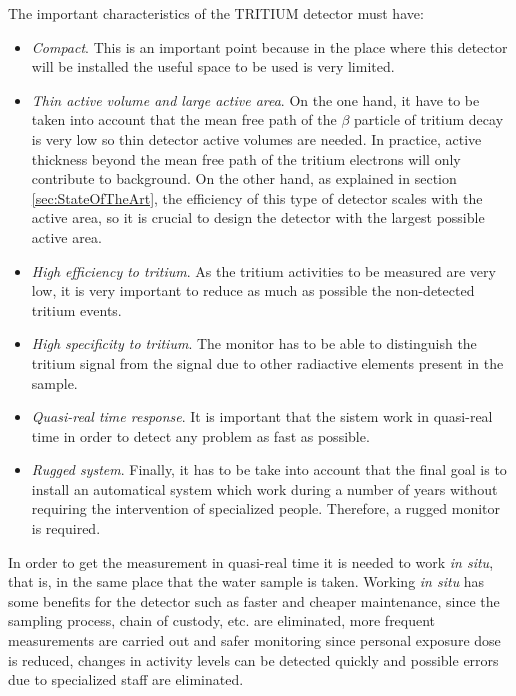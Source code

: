 The important characteristics of the TRITIUM detector must have:

\begin{itemize}

\item{} \textit{Compact}. This is an important point because in the place where this detector will be installed the useful space to be used is very limited.

\item{} \textit{Thin active volume and large active area}. On the one hand, it have to be taken into account that the mean free path of the $\beta$ particle of tritium decay is very low so thin detector active volumes are needed. In practice, active thickness beyond the mean free path of the tritium electrons will only contribute to background. On the other hand, as explained in section \ref{sec:StateOfTheArt}, the efficiency of this type of detector scales with the active area, so it is crucial to design the detector with the largest possible active area.

\item{} \textit{High efficiency to tritium}. As the tritium activities to be measured are very low, it is very important to reduce as much as possible the non-detected tritium events.

\item{} \textit{High specificity to tritium}. The monitor has to be able to distinguish the tritium signal from the signal due to other radiactive elements present in the sample.

\item{} \textit{Quasi-real time response}. It is important that the sistem work in quasi-real time in order to detect any problem as fast as possible. 

\item{} \textit{Rugged system}. Finally, it has to be take into account that the final goal is to install an automatical system which work during a number of years without requiring the intervention of specialized people. Therefore, a rugged monitor is required.

\end{itemize}

In order to get the measurement in quasi-real time it is needed to work \textit{in situ}, that is, in the same place that the water sample is taken. Working \textit{in situ} has some benefits for the detector such as faster and cheaper maintenance, since the sampling process, chain of custody, etc. are eliminated, more frequent measurements are carried out and safer monitoring since personal exposure dose is reduced, changes in activity levels can be detected quickly and possible errors due to specialized staff are eliminated.


